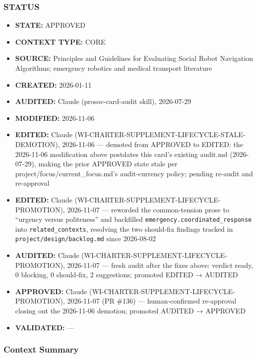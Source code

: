 \documentclass[utf8]{frontiers_suppmat} %
\providecommand{\tightlist}{%
  \setlength{\itemsep}{0pt}\setlength{\parskip}{0pt}}
\begin{document}
\subsubsection{STATUS}\label{status}

\begin{itemize}
\tightlist
\item
  \textbf{STATE:} APPROVED
\item
  \textbf{CONTEXT TYPE:} CORE
\item
  \textbf{SOURCE:} Principles and Guidelines for Evaluating Social Robot
  Navigation Algorithms; emergency robotics and medical transport
  literature
\item
  \textbf{CREATED:} 2026-01-11
\item
  \textbf{AUDITED:} Claude (prosoc-card-audit skill), 2026-07-29
\item
  \textbf{MODIFIED:} 2026-11-06
\item
  \textbf{EDITED:} Claude
  (WI-CHARTER-SUPPLEMENT-LIFECYCLE-STALE-DEMOTION), 2026-11-06 ---
  demoted from APPROVED to EDITED: the 2026-11-06 modification above
  postdates this card's existing audit.md (2026-07-29), making the prior
  APPROVED state stale per project/focus/current\_focus.md's
  audit-currency policy; pending re-audit and re-approval
\item
  \textbf{EDITED:} Claude (WI-CHARTER-SUPPLEMENT-LIFECYCLE-PROMOTION),
  2026-11-07 --- reworded the common-tension prose to ``urgency versus
  politeness'' and backfilled
  \texttt{emergency.coordinated\_response} into
  \texttt{related\_contexts}, resolving the two
  should-fix findings tracked in
  \texttt{project/design/backlog.md} since 2026-08-02
\item
  \textbf{AUDITED:} Claude (WI-CHARTER-SUPPLEMENT-LIFECYCLE-PROMOTION),
  2026-11-07 --- fresh audit after the fixes above: verdict ready, 0
  blocking, 0 should-fix, 2 suggestions; promoted EDITED → AUDITED
\item
  \textbf{APPROVED:} Claude (WI-CHARTER-SUPPLEMENT-LIFECYCLE-PROMOTION),
  2026-11-07 (PR \#136) --- human-confirmed re-approval closing out the
  2026-11-06 demotion; promoted AUDITED → APPROVED
\item
  \textbf{VALIDATED:} ---
\end{itemize}

\subsubsection{Context Summary}\label{context-summary}
\end{document}
